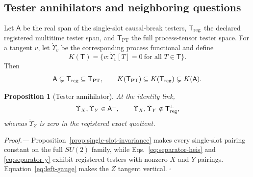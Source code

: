 \documentclass[aps,prl,reprint,superscriptaddress,nofootinbib]{revtex4-2}
\newcommand{\PT}{\mathrm{PT}}
\newtheorem{proposition}{Proposition}
\begin{document}
\subsection{Tester annihilators and neighboring questions}

Let $\mathsf A$ be the real span of the single-slot causal-break testers, $\mathsf T_{\rm reg}$ the declared registered multitime tester span, and $\mathsf T_{\PT}$ the full process-tensor tester space.  For a tangent $v$, let $\dot\Upsilon_v$ be the corresponding process functional and define
\begin{equation}
 K(\mathsf T)=\{v:\dot\Upsilon_v[T]=0\ \text{for all }T\in\mathsf T\}.
 \label{eq:tester-kernel}
\end{equation}
Then
\begin{equation}
 \mathsf A\subsetneq\mathsf T_{\rm reg}\subseteq\mathsf T_{\PT},
 \qquad
 K(\mathsf T_{\PT})\subseteq K(\mathsf T_{\rm reg})\subsetneq K(\mathsf A).
 \label{eq:tester-inclusions}
\end{equation}

\begin{proposition}[Tester annihilator]
\label{prop:annihilator}
At the identity link,
\begin{equation}
 \dot\Upsilon_X,\dot\Upsilon_Y\in\mathsf A^\perp,
 \qquad
 \dot\Upsilon_X,\dot\Upsilon_Y\notin\mathsf T_{\rm reg}^\perp,
 \label{eq:annihilator}
\end{equation}
whereas $\dot\Upsilon_Z$ is zero in the registered exact quotient.
\end{proposition}

\emph{Proof.---}
Proposition~\ref{prop:single-slot-invariance} makes every single-slot pairing constant on the full $SU(2)$ family, while Eqs.~\eqref{eq:separator-heis} and \eqref{eq:separator-y} exhibit registered testers with nonzero $X$ and $Y$ pairings.  Equation~\eqref{eq:left-gauge} makes the $Z$ tangent vertical. \hfill$\square$
\end{document}
